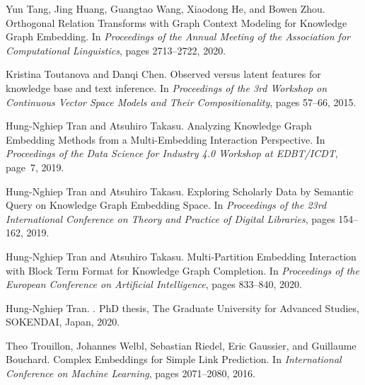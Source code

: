 \documentclass{article}
\theoremstyle{plain}
\theoremstyle{remark}
\begin{document}
\begin{thebibliography}{}
Yun Tang, Jing Huang, Guangtao Wang, Xiaodong He, and Bowen Zhou.
\newblock Orthogonal {{Relation Transforms}} with {{Graph Context Modeling}}
  for {{Knowledge Graph Embedding}}.
\newblock In {\em Proceedings of the {{Annual Meeting}} of the {{Association}}
  for {{Computational Linguistics}}}, pages 2713--2722, 2020.

Kristina Toutanova and Danqi Chen.
\newblock Observed versus latent features for knowledge base and text
  inference.
\newblock In {\em Proceedings of the 3rd {{Workshop}} on {{Continuous Vector
  Space Models}} and Their {{Compositionality}}}, pages 57--66, 2015.

Hung-Nghiep Tran and Atsuhiro Takasu.
\newblock Analyzing {{Knowledge Graph Embedding Methods}} from a
  {{Multi-Embedding Interaction Perspective}}.
\newblock In {\em Proceedings of the {{Data Science}} for {{Industry}} 4.0
  {{Workshop}} at {{EDBT}}/{{ICDT}}}, page~7, 2019.

Hung-Nghiep Tran and Atsuhiro Takasu.
\newblock Exploring {{Scholarly Data}} by {{Semantic Query}} on {{Knowledge
  Graph Embedding Space}}.
\newblock In {\em Proceedings of the 23rd {{International Conference}} on
  {{Theory}} and {{Practice}} of {{Digital Libraries}}}, pages 154--162, 2019.

Hung-Nghiep Tran and Atsuhiro Takasu.
\newblock Multi-{{Partition Embedding Interaction}} with {{Block Term Format}}
  for {{Knowledge Graph Completion}}.
\newblock In {\em Proceedings of the {{European Conference}} on {{Artificial
  Intelligence}}}, pages 833--840, 2020.

Hung-Nghiep Tran.
.
\newblock PhD thesis, The Graduate University for Advanced Studies, SOKENDAI,
  {Japan}, 2020.

Theo Trouillon, Johannes Welbl, Sebastian Riedel, {Eric Gaussier}, and
  {Guillaume Bouchard}.
\newblock Complex {{Embeddings}} for {{Simple Link Prediction}}.
\newblock In {\em International {{Conference}} on {{Machine Learning}}}, pages
  2071--2080, 2016.


\end{thebibliography}
\end{document}
